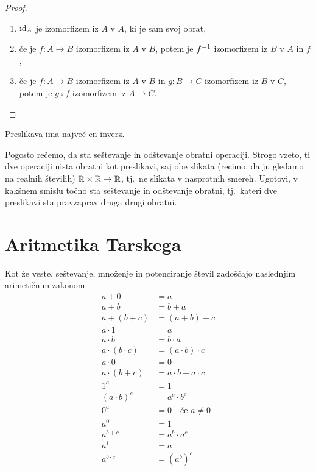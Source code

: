 \begin{proof}
  \parbox{0pt}{}
  \begin{enumerate}
  \item $\id[A]$ je izomorfizem iz $A$ v $A$, ki je sam svoj obrat,
  \item če je $f : A \to B$ izomorfizem iz $A$ v $B$, potem je $\inv{f}$ izomorfizem iz
    $B$ v $A$ in $f$,
  \item če je $f : A \to B$ izomorfizem iz $A$ v $B$ in $g : B \to C$ izomorfizem iz $B$ v
    $C$, potem je $g \circ f$ izomorfizem iz $A \to C$. \qedhere
  \end{enumerate}
\end{proof}

\begin{trditev}
  Preslikava ima največ en inverz.
\end{trditev}

\begin{naloga}
  Pogosto rečemo, da sta seštevanje in odštevanje obratni operaciji. Strogo vzeto, ti dve
  operaciji nista obratni kot preslikavi, saj obe slikata (recimo, da ju gledamo na
  realnih številih) $\RR \times \RR \to \RR$, tj.~ne slikata v nasprotnih smereh. Ugotovi,
  v kakšnem smislu točno sta seštevanje in odštevanje obratni, tj.~kateri dve preslikavi
  sta pravzaprav druga drugi obratni.
\end{naloga}


\section{Aritmetika Tarskega}
\label{sec:aritmetika-tarskega}

Kot že veste, seštevanje, množenje in potenciranje števil zadoščajo naslednjim arimetičnim
zakonom:
%
\begin{align*}
  a + 0 &= a \\
  a + b &= b + a \\
  a + (b + c) &= (a + b) + c \\
  a \cdot 1 &= a \\
  a \cdot b &= b \cdot a \\
  a \cdot (b \cdot c) &= (a \cdot b) \cdot c \\
  a \cdot 0 &= 0 \\
  a \cdot (b + c) &= a \cdot b + a \cdot c \\
  1^a &= 1 \\
  (a \cdot b)^c &= a^c \cdot b^c \\
  0^a &= 0 \quad \text{če $a \neq 0$} \\
  a^0 &= 1 \\
  a^{b + c} &= a^b \cdot a^c \\
  a^1 &= a \\
  a^{b \cdot c} &= (a^b)^c
\end{align*}


